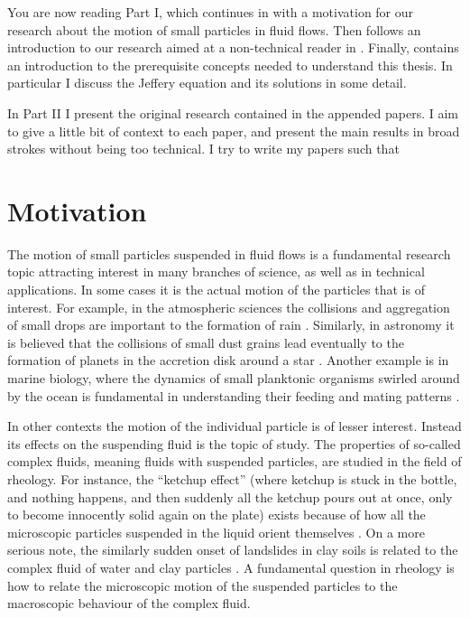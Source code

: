 \documentclass[thesis.tex]{subfiles}
\begin{document}
You are now reading Part I, which continues in  with a motivation for our research about the motion of small particles in fluid flows. Then follows an introduction to our research aimed at a non-technical reader in . Finally,  contains an introduction to the prerequisite concepts needed to understand this thesis. In particular I discuss the Jeffery equation and its solutions in some detail.

In Part II I present the original research contained in the appended papers. I aim to give a little bit of context to each paper, and present the main results in broad strokes without being too technical. I try to write my papers such that 

\chapter{Motivation}\label{sec:motivation}

The motion of small particles suspended in fluid flows is a fundamental research topic attracting interest in many branches of science, as well as in technical applications. In some cases it is the actual motion of the particles that is of interest. For example, in the atmospheric sciences the collisions and aggregation of small drops are important to the formation of rain \cite{devenish2012}. Similarly, in astronomy it is believed that the collisions of small dust grains lead eventually to the formation of planets in the accretion disk around a star \cite{wilkinson2008}. Another example is in marine biology, where the dynamics of small planktonic organisms swirled around by the ocean is fundamental in understanding their feeding and mating patterns \cite{guasto2012}. 

In other contexts the motion of the individual particle is of lesser interest. Instead its effects on the suspending fluid is the topic of study. The properties of so-called complex fluids, meaning fluids with suspended particles, are studied in the field of rheology. For instance, the ``ketchup effect'' (where ketchup is stuck in the bottle, and nothing happens, and then suddenly all the ketchup pours out at once, only to become innocently solid again on the plate) exists because of how all the microscopic particles suspended in the liquid orient themselves \cite{bayod2008}. On a more serious note, the similarly sudden onset of landslides in clay soils is related to the complex fluid of water and clay particles \cite{coussot2002}. A fundamental question in rheology is how to relate the microscopic motion of the suspended particles to the macroscopic behaviour of the complex fluid.
\end{document}
